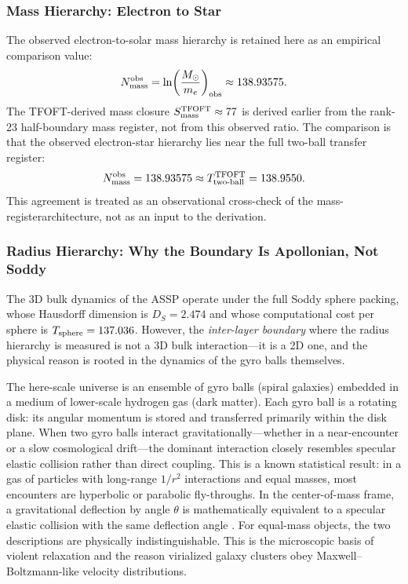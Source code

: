 \documentclass[11pt,a4paper]{article}
\begin{document}
\subsubsection{Mass Hierarchy: Electron to Star}

The observed electron-to-solar mass hierarchy is retained here as an empirical comparison value:
\[
N_{\rm mass}^{\rm obs}
=
\ln\!\left(\frac{M_\odot}{m_e}\right)_{\rm obs}
\approx
138.93575.
\]
The TFOFT-derived mass closure \(S_{\rm mass}^{\rm TFOFT}\approx77\) is derived earlier from the rank-23 half-boundary mass register, not from this observed ratio. The comparison is that the observed electron-star hierarchy lies near the full two-ball transfer register:
\[
N_{\rm mass}^{\rm obs}
=
138.93575
\approx
T_{\rm two\text{-}ball}^{\rm TFOFT}
=
138.9550.
\]
This agreement is treated as an observational cross-check of the mass-registerarchitecture, not as an input to the derivation.

\subsubsection{Radius Hierarchy: Why the Boundary Is Apollonian, Not Soddy}
\label{sec:radius_apollonian}

The 3D bulk dynamics of the ASSP operate under the full Soddy sphere packing, whose Hausdorff dimension is \(D_S = 2.474\) and whose computational cost per sphere is \(T_{\rm sphere} = 137.036\). However, the \emph{inter-layer boundary} where the radius hierarchy is measured is not a 3D bulk interaction---it is a 2D one, and the physical reason is rooted in the dynamics of the gyro balls themselves.

The here-scale universe is an ensemble of gyro balls (spiral galaxies) embedded in a medium of lower-scale hydrogen gas (dark matter). Each gyro ball is a rotating disk: its angular momentum is stored and transferred primarily within the disk plane. When two gyro balls interact gravitationally---whether in a near-encounter or a slow cosmological drift---the dominant interaction closely resembles specular elastic collision rather than direct coupling. This is a known statistical result: in a gas of particles with long-range \(1/r^2\) interactions and equal masses, most encounters are hyperbolic or parabolic fly-throughs. In the center-of-mass frame, a gravitational deflection by angle \(\theta\) is mathematically equivalent to a specular elastic collision with the same deflection angle \cite{Lynden-Bell1967}. For equal-mass objects, the two descriptions are physically indistinguishable. This is the microscopic basis of violent relaxation and the reason virialized galaxy clusters obey Maxwell--Boltzmann-like velocity distributions.
\end{document}
